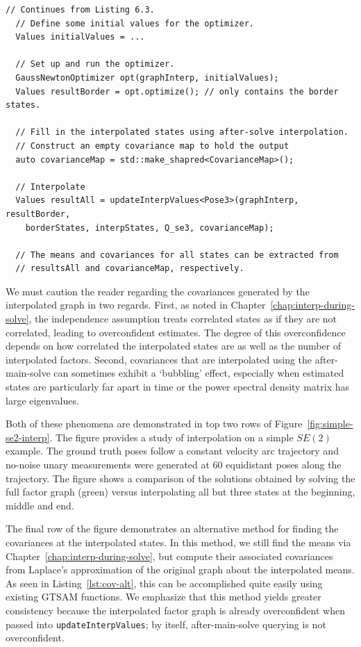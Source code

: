 \begin{lstlisting}[style=C++Style, label={lst:optimize}, caption={Optimization and after-main-solve interpolation.}, firstnumber=last]
  // Continues from Listing 6.3.
  // Define some initial values for the optimizer.
  Values initialValues = ... 
  
  // Set up and run the optimizer.
  GaussNewtonOptimizer opt(graphInterp, initialValues);
  Values resultBorder = opt.optimize(); // only contains the border states.
  
  // Fill in the interpolated states using after-solve interpolation.
  // Construct an empty covariance map to hold the output
  auto covarianceMap = std::make_shapred<CovarianceMap>();
  
  // Interpolate
  Values resultAll = updateInterpValues<Pose3>(graphInterp, resultBorder,
    borderStates, interpStates, Q_se3, covarianceMap);
    
  // The means and covariances for all states can be extracted from
  // resultsAll and covarianceMap, respectively.
\end{lstlisting}

We must caution the reader regarding the covariances generated by the interpolated graph in two regards. First, as noted in Chapter~\ref{chap:interp-during-solve}, the independence assumption treats correlated states as if they are not correlated, leading to overconfident estimates. The degree of this overconfidence depends on how correlated the interpolated states are as well as the number of interpolated factors. Second, covariances that are interpolated using the after-main-solve can sometimes exhibit a `bubbling' effect, especially when estimated states are particularly far apart in time or the power spectral density matrix has large eigenvalues.

Both of these phenomena are demonstrated in top two rows of Figure~\ref{fig:simple-se2-interp}. The figure provides a study of interpolation on a simple $SE(2)$ example. The ground truth poses follow a constant velocity arc trajectory and no-noise unary measurements were generated at 60 equidistant poses along the trajectory. The figure shows a comparison of the solutions obtained by solving the full factor graph (green) versus interpolating all but three states at the beginning, middle and end. 

The final row of the figure demonstrates an alternative method for finding the covariances at the interpolated states. In this method, we still find the means via Chapter~\ref{chap:interp-during-solve}, but compute their associated covariances from Laplace's approximation of the original graph about the interpolated means. As seen in Listing~\ref{lst:cov-alt}, this can be accomplished quite easily using existing \ac{GTSAM} functions. We emphasize that this method yields greater consistency because the interpolated factor graph is already overconfident when passed into \texttt{updateInterpValues}; by itself, after-main-solve querying is not overconfident.

